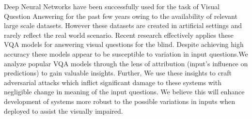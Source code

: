 Deep Neural Networks have been successfully used for the task of Visual Question Answering for the past few years owing to the availability of relevant large scale datasets. However these datasets are created in artificial settings and rarely reflect the real world scenario. Recent research effectively applies these {VQA} models for answering visual questions for the blind. Despite achieving high accuracy these models appear to be susceptible to variation in input questions.We analyze popular {VQA} models through the lens of attribution (input's influence on predictions) to gain valuable insights. Further, We use these insights to craft adversarial attacks which inflict significant damage to these systems with negligible change in meaning of the input questions. We believe this will enhance development of systems more robust to the possible variations in inputs when deployed to assist the visually impaired.

